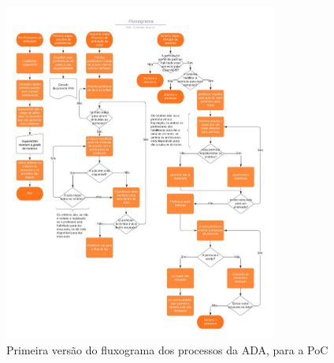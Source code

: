\documentclass[12pt]{article}
\begin{document}
\begin{figure}[h]
    \centering
    \includegraphics[width=0.8\textwidth]{fluxograma.jpeg}
    \caption{Primeira versão do fluxograma dos processos da ADA, para a PoC}
    \label{fig:diagrama}
\end{figure}
\end{document}
